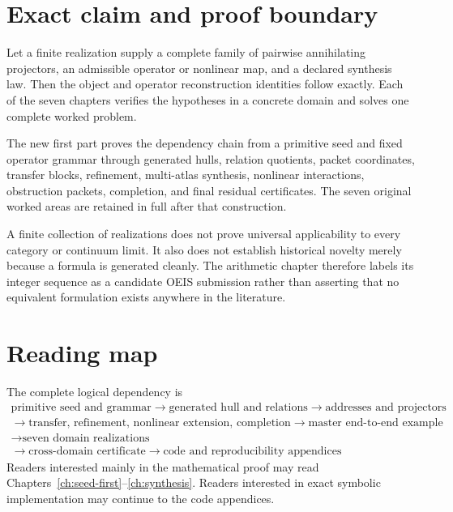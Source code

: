 \documentclass[11pt,oneside]{book}
\theoremstyle{definition}
\theoremstyle{remark}
\begin{document}
\chapter*{Exact claim and proof boundary}
\begin{resultbox}
Let a finite realization supply a complete family of pairwise annihilating projectors, an admissible operator or nonlinear map, and a declared synthesis law. Then the object and operator reconstruction identities follow exactly. Each of the seven chapters verifies the hypotheses in a concrete domain and solves one complete worked problem.
\end{resultbox}

\begin{resultbox}
The new first part proves the dependency chain from a primitive seed and fixed operator grammar through generated hulls, relation quotients, packet coordinates, transfer blocks, refinement, multi-atlas synthesis, nonlinear interactions, obstruction packets, completion, and final residual certificates.  The seven original worked areas are retained in full after that construction.
\end{resultbox}

\begin{boundarybox}
A finite collection of realizations does not prove universal applicability to every category or continuum limit. It also does not establish historical novelty merely because a formula is generated cleanly. The arithmetic chapter therefore labels its integer sequence as a candidate OEIS submission rather than asserting that no equivalent formulation exists anywhere in the literature.
\end{boundarybox}

\chapter*{Reading map}
The complete logical dependency is
\[
\boxed{
\begin{gathered}
\text{primitive seed and grammar}\longrightarrow\text{generated hull and relations}\longrightarrow\text{addresses and projectors}\\[2pt]
\longrightarrow\text{transfer, refinement, nonlinear extension, completion}\longrightarrow\text{master end-to-end example}\\[2pt]
\longrightarrow\text{seven domain realizations}\\[2pt]
\longrightarrow
\text{cross-domain certificate}
\longrightarrow
\text{code and reproducibility appendices}
\end{gathered}}
\]
Readers interested mainly in the mathematical proof may read Chapters~\ref{ch:seed-first}--\ref{ch:synthesis}. Readers interested in exact symbolic implementation may continue to the code appendices.
\end{document}

